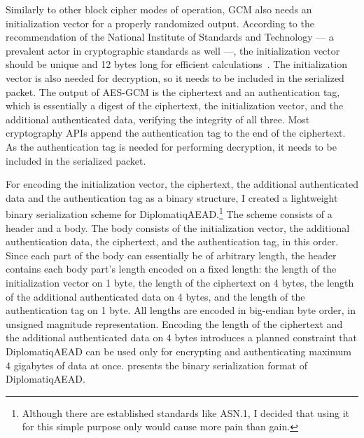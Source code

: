 Similarly to other block cipher modes of operation, GCM also needs an initialization vector for a properly randomized output. According to the recommendation of the National Institute of Standards and Technology — a prevalent actor in cryptographic standards as well —, the initialization vector should be unique and 12 bytes long for efficient calculations~\cite{dworkin2007sp}. The initialization vector is also needed for decryption, so it needs to be included in the serialized packet. The output of AES-GCM is the ciphertext and an authentication tag, which is essentially a digest of the ciphertext, the initialization vector, and the additional authenticated data, verifying the integrity of all three. Most cryptography APIs append the authentication tag to the end of the ciphertext. As the authentication tag is needed for performing decryption, it needs to be included in the serialized packet.

For encoding the initialization vector, the ciphertext, the additional authenticated data and the authentication tag as a binary structure, I created a lightweight binary serialization scheme for DiplomatiqAEAD.\footnote{Although there are established standards like ASN.1, I decided that using it for this simple purpose only would cause more pain than gain.} The scheme consists of a header and a body. The body consists of the initialization vector, the additional authentication data, the ciphertext, and the authentication tag, in this order. Since each part of the body can essentially be of arbitrary length, the header contains each body part's length encoded on a fixed length: the length of the initialization vector on 1 byte, the length of the ciphertext on 4 bytes, the length of the additional authenticated data on 4 bytes, and the length of the authentication tag on 1 byte. All lengths are encoded in big-endian byte order, in unsigned magnitude representation. Encoding the length of the ciphertext and the additional authenticated data on 4 bytes introduces a planned constraint that DiplomatiqAEAD can be used only for encrypting and authenticating maximum 4 gigabytes of data at once.  presents the binary serialization format of DiplomatiqAEAD.

